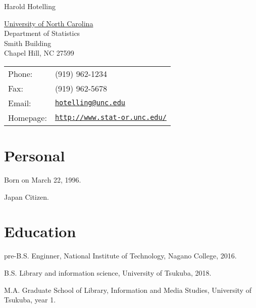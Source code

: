 \documentclass[letterpaper]{article}
\def\name{Harold Hotelling}
\renewenvironment{itemize}{
  \begin{list}{}{
    \setlength{\leftmargin}{1.5em}
  }
}{
  \end{list}
}
\begin{document}
{\huge \name}


\vspace{0.25in}

\begin{minipage}{0.45\linewidth}
  \href{http://www.unc.edu/}{University of North Carolina} \\
  Department of Statistics \\
  Smith Building \\
  Chapel Hill, NC 27599
\end{minipage}
\begin{minipage}{0.45\linewidth}
  \begin{tabular}{ll}
    Phone: & (919) 962-1234 \\
    Fax: &  (919) 962-5678 \\
    Email: & \href{mailto:hotelling@unc.edu}{\tt hotelling@unc.edu} \\
    Homepage: & \href{http://www.stat-or.unc.edu/}{\tt http://www.stat-or.unc.edu/} \\
  \end{tabular}
\end{minipage}


\section*{Personal}

\begin{itemize}
\item Born on March 22, 1996.
\item Japan Citizen.
\end{itemize}


\section*{Education}

\begin{itemize}
  \item pre-B.S. Enginner, National Institute of Technology, Nagano College, 2016.

  \item B.S. Library and information science, University of Tsukuba, 2018.

  \item M.A. Graduate School of Library, Information and Media Studies, University of Tsukuba, year 1.
\end{itemize}
\end{document}
